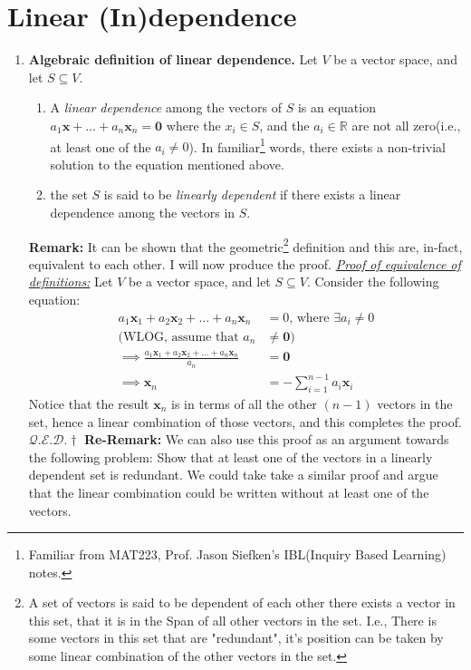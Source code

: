 \documentclass[oneside, 12pt]{book}
\newcommand{\settag}[1]{\renewcommand{\theenumi}{#1}}
\newcommand{\R}{\mathbb{R}}
\newcommand{\qed}{\hfill $\mathcal{Q}.\mathcal{E}.\mathcal{D}.\dagger$}
\newcommand{\tbf}[1]{\textbf{#1}}
\newcommand{\tit}[1]{\textit{#1}}
\begin{document}
\section{Linear (In)dependence}
    \begin{enumerate}
        \settag{1.4.2}
        \item \textbf{Algebraic definition of linear dependence.} Let $V$ be a vector space, and let $S\subseteq V$.
            \begin{enumerate}
                \item A \textit{linear dependence} among the vectors of $S$ is an equation $a_1\mathbf{x} + \ldots + a_n\mathbf{x}_n = \mathbf{0}$ where the $x_i\in S$, and the $a_i\in \R$ are not all zero(i.e., at least one of the $a_i\neq 0$). In familiar\footnote{Familiar from MAT223, Prof. Jason Siefken's IBL(Inquiry Based Learning) notes.} words, there exists a non-trivial solution to the equation mentioned above.
                \item the set $S$ is said to be \textit{linearly dependent} if there exists a linear dependence among the vectors in $S$.
            \end{enumerate}
            \tbf{Remark: }It can be shown that the geometric\footnote{A set of vectors is said to be dependent of each other there exists a vector in this set, that it is in the Span of all other vectors in the set. I.e., There is some vectors in this set that are "redundant", it's position can be taken by some linear combination of the other vectors in the set.} definition and this are, in-fact, equivalent to each other. I will now produce the proof. \newline
        \tit{\underline{Proof of equivalence of definitions:}} \newline
        Let $V$ be a vector space, and let $S\subseteq V$. Consider the following equation:
        \begin{align*}
            a_1\mathbf{x}_1 + a_2\mathbf{x}_2 + \ldots + a_n\mathbf{x}_n &= 0\text{, where } \exists a_i\neq 0 \\
            \text{(WLOG, assume that } a_n &\neq \mathbf{0}\text{)}\\
            \implies \frac{a_1\mathbf{x}_1 + a_2\mathbf{x}_2 + \ldots + a_n\mathbf{x}_n}{a_n}&=\mathbf{0}\\
            \implies \mathbf{x}_n &= -\sum_{i=1}^{n-1}a_i\mathbf{x}_i
        \end{align*}
        Notice that the result $\mathbf{x}_n$ is in terms of all the other $(n-1)$ vectors in the set, hence a linear combination of those vectors, and this completes the proof.
        \qed\newline
        \textbf{Re-Remark: }We can also use this proof as an argument towards the following problem: Show that at least one of the vectors in a linearly dependent set is redundant. We could take take a similar proof and argue that the linear combination could be written without at least one of the vectors.
        

\end{enumerate}
\end{document}
